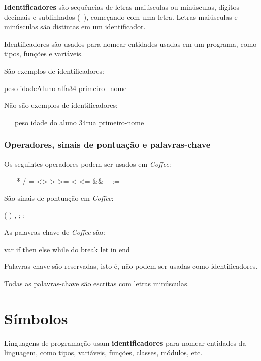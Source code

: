 \documentclass[a4paper,11pt,brazil]{article}
\newcommand{\lang}{\textsl{Coffee}}
\begin{document}
\textbf{Identificadores} são sequências de letras maiúsculas ou
minúsculas, dígitos decimais e sublinhados (\texttt{\_}), começando
com uma letra. Letras maiúsculas e minúsculas são distintas em um
identificador.

Identificadores são usados para nomear entidades usadas em um
programa, como tipos, funções e variáveis.

São exemplos de identificadores:
\begin{pygmented}[lang=text]
peso
idadeAluno
alfa34
primeiro_nome
\end{pygmented}

Não são exemplos de identificadores:
\begin{pygmented}[lang=text]
__peso
idade do aluno
34rua
primeiro-nome
\end{pygmented}


\subsubsection{Operadores, sinais de pontuação  e palavras-chave}

Os seguintes operadores podem ser usados em \lang{}:
\begin{pygmented}[lang=text]
+ - * / %
= <> > >= < <=
&& ||
:=
\end{pygmented}

São sinais de pontuação em \lang{}:
\begin{pygmented}[lang=text]
( ) , ; :
\end{pygmented}

As palavras-chave de \lang{} são:
\begin{pygmented}[lang=text]
var
if then else
while do break
let in end
\end{pygmented}

Palavras-chave são reservadas, isto é, não podem ser usadas como
identificadores.

Todas as palavras-chave são escritas com letras minúsculas.


\section{Símbolos}

Linguagens de programação usam \textbf{identificadores} para nomear
entidades da linguagem, como tipos, variáveis, funções, classes,
módulos, etc.
\end{document}
